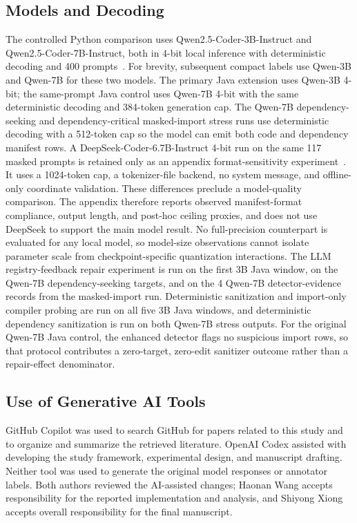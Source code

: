 \documentclass[pdflatex,sn-basic]{sn-jnl}
\begin{document}
\subsection{Models and Decoding}

The controlled Python comparison uses Qwen2.5-Coder-3B-Instruct and Qwen2.5-Coder-7B-Instruct, both in 4-bit local inference with deterministic decoding and 400 prompts~\citep{Hui2024Qwen25Coder}. For brevity, subsequent compact labels use Qwen-3B and Qwen-7B for these two models. The primary Java extension uses Qwen-3B 4-bit; the same-prompt Java control uses Qwen-7B 4-bit with the same deterministic decoding and 384-token generation cap. The Qwen-7B dependency-seeking and dependency-critical masked-import stress runs use deterministic decoding with a 512-token cap so the model can emit both code and dependency manifest rows. A DeepSeek-Coder-6.7B-Instruct 4-bit run on the same 117 masked prompts is retained only as an appendix format-sensitivity experiment~\citep{Guo2024DeepSeekCoder}. It uses a 1024-token cap, a tokenizer-file backend, no system message, and offline-only coordinate validation. These differences preclude a model-quality comparison. The appendix therefore reports observed manifest-format compliance, output length, and post-hoc ceiling proxies, and does not use DeepSeek to support the main model result. No full-precision counterpart is evaluated for any local model, so model-size observations cannot isolate parameter scale from checkpoint-specific quantization interactions. The LLM registry-feedback repair experiment is run on the first 3B Java window, on the Qwen-7B dependency-seeking targets, and on the 4 Qwen-7B detector-evidence records from the masked-import run. Deterministic sanitization and import-only compiler probing are run on all five 3B Java windows, and deterministic dependency sanitization is run on both Qwen-7B stress outputs. For the original Qwen-7B Java control, the enhanced detector flags no suspicious import rows, so that protocol contributes a zero-target, zero-edit sanitizer outcome rather than a repair-effect denominator.

\subsection{Use of Generative AI Tools}

GitHub Copilot was used to search GitHub for papers related to this study and to organize and summarize the retrieved literature. OpenAI Codex assisted with developing the study framework, experimental design, and manuscript drafting. Neither tool was used to generate the original model responses or annotator labels. Both authors reviewed the AI-assisted changes; Haonan Wang accepts responsibility for the reported implementation and analysis, and Shiyong Xiong accepts overall responsibility for the final manuscript.
\end{document}
